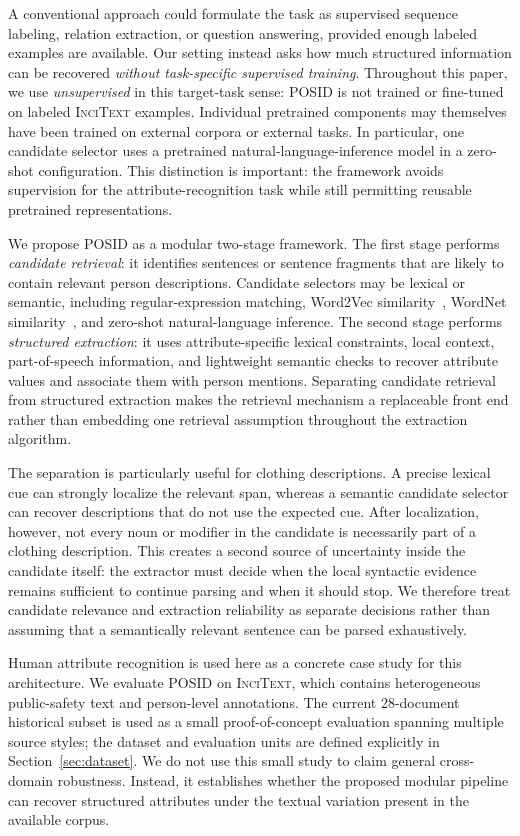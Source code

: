 \documentclass[sigconf,nonacm]{acmart}
\newcommand{\posid}{\textsc{POSID}}
\newcommand{\incitext}{\textsc{InciText}}
\begin{document}
A conventional approach could formulate the task as supervised sequence
labeling, relation extraction, or question answering, provided enough labeled
examples are available. Our setting instead asks how much structured
information can be recovered \emph{without task-specific supervised training}.
Throughout this paper, we use \emph{unsupervised} in this target-task sense:
\posid{} is not trained or fine-tuned on labeled \incitext{} examples. Individual
pretrained components may themselves have been trained on external corpora or
external tasks. In particular, one candidate selector uses a pretrained
natural-language-inference model in a zero-shot configuration. This distinction
is important: the framework avoids supervision for the attribute-recognition
task while still permitting reusable pretrained representations.

We propose \posid{} as a modular two-stage framework. The first stage performs
\emph{candidate retrieval}: it identifies sentences or sentence fragments that
are likely to contain relevant person descriptions. Candidate selectors may be
lexical or semantic, including regular-expression matching, Word2Vec
similarity~\cite{mikolov2013efficient}, WordNet similarity~\cite{wordnet98}, and
zero-shot natural-language inference. The second stage performs
\emph{structured extraction}: it uses attribute-specific lexical constraints,
local context, part-of-speech information, and lightweight semantic checks to
recover attribute values and associate them with person mentions. Separating
candidate retrieval from structured extraction makes the retrieval mechanism a
replaceable front end rather than embedding one retrieval assumption throughout
the extraction algorithm.

The separation is particularly useful for clothing descriptions. A precise
lexical cue can strongly localize the relevant span, whereas a semantic
candidate selector can recover descriptions that do not use the expected cue.
After localization, however, not every noun or modifier in the candidate is
necessarily part of a clothing description. This creates a second source of
uncertainty inside the candidate itself: the extractor must decide when the
local syntactic evidence remains sufficient to continue parsing and when it
should stop. We therefore treat candidate relevance and extraction reliability
as separate decisions rather than assuming that a semantically relevant
sentence can be parsed exhaustively.

Human attribute recognition is used here as a concrete case study for this
architecture. We evaluate \posid{} on \incitext{}, which contains heterogeneous
public-safety text and person-level annotations. The current 28-document
historical subset is used as a small proof-of-concept evaluation spanning
multiple source styles; the dataset and evaluation units are defined explicitly
in Section~\ref{sec:dataset}. We do not use this small study to claim general
cross-domain robustness. Instead, it establishes whether the proposed modular
pipeline can recover structured attributes under the textual variation present
in the available corpus.
\end{document}
